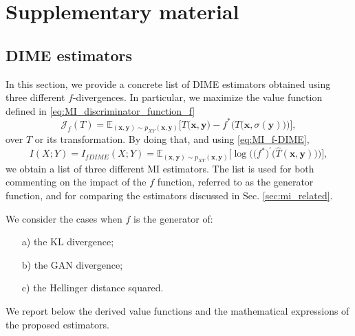 \newpage
\section{Supplementary material}
\label{sec:mi_appendix}

\subsection{DIME estimators}
\label{subsec:mi_appendix_DIME_examples}
In this section, we provide a concrete list of DIME estimators obtained using three different $f$-divergences. In particular, we maximize the value function defined in \eqref{eq:MI_discriminator_function_f}
\begin{equation}
    \mathcal{J}_{f}(T) =  \mathbb{E}_{(\mathbf{x},\mathbf{y}) \sim p_{XY}(\mathbf{x},\mathbf{y})}\biggl[T\bigl(\mathbf{x},\mathbf{y}\bigr)-f^*\biggl(T\bigl(\mathbf{x},\sigma(\mathbf{y})\bigr)\biggr)\biggr],
\end{equation}
over $T$ or its transformation. By doing that, and using \eqref{eq:MI_f-DIME}, 
\begin{equation}
    I(X;Y) = I_{fDIME}(X;Y) =  \mathbb{E}_{(\mathbf{x},\mathbf{y}) \sim p_{XY}(\mathbf{x},\mathbf{y})}\biggl[ \log \biggl(\bigl(f^{*}\bigr)^{\prime}\bigl(\hat{T}(\mathbf{x},\mathbf{y})\bigr) \biggr) \biggr],
\end{equation}
we obtain a list of three different MI estimators.
The list is used for both commenting on the impact of the $f$ function, referred to as the generator function, and for comparing the estimators discussed in Sec. \ref{sec:mi_related}. 

We consider the cases when $f$ is the generator of: 
\begin{itemize}
    \item[{a)}] the KL divergence;
    \item[{b)}] the GAN divergence; 
    \item[{c)}] the Hellinger distance squared.
\end{itemize}
We report below the derived value functions and the mathematical expressions of the proposed estimators. 

